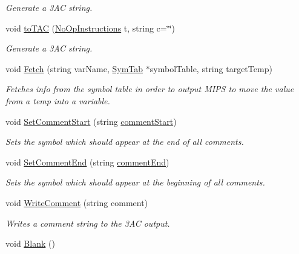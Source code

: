 \begin{DoxyCompactItemize}
\begin{DoxyCompactList}\small\item\em Generate a 3\-A\-C string. \end{DoxyCompactList}\item 
void \hyperlink{classTAC__Generator_a0ee1e11b169a2ead7244c00869d66858}{to\-T\-A\-C} (\hyperlink{classTAC__Generator_a3942f3e280fb83e44ad85eb13d56dfb5}{No\-Op\-Instructions} t, string c=\char`\"{}\char`\"{})
\begin{DoxyCompactList}\small\item\em Generate a 3\-A\-C string. \end{DoxyCompactList}\item 
void \hyperlink{classTAC__Generator_aacf5782b612a76a148478154306d3216}{Fetch} (string var\-Name, \hyperlink{classSymTab}{Sym\-Tab} $\ast$symbol\-Table, string target\-Temp)
\begin{DoxyCompactList}\small\item\em Fetches info from the symbol table in order to output M\-I\-P\-S to move the value from a temp into a variable. \end{DoxyCompactList}\item 
void \hyperlink{classTAC__Generator_a8570a01bd5bf10e849017d412440799a}{Set\-Comment\-Start} (string \hyperlink{classTAC__Generator_ac530666b410f226e764e9eb33b2a4666}{comment\-Start})
\begin{DoxyCompactList}\small\item\em Sets the symbol which should appear at the end of all comments. \end{DoxyCompactList}\item 
void \hyperlink{classTAC__Generator_ad96d5a262c29a34a34324ed6c7aeffe1}{Set\-Comment\-End} (string \hyperlink{classTAC__Generator_a9f011cfb810ea2cd01b31b9a48762123}{comment\-End})
\begin{DoxyCompactList}\small\item\em Sets the symbol which should appear at the beginning of all comments. \end{DoxyCompactList}\item 
void \hyperlink{classTAC__Generator_a37a03e11321195b25600eb008b20b800}{Write\-Comment} (string comment)
\begin{DoxyCompactList}\small\item\em Writes a comment string to the 3\-A\-C output. \end{DoxyCompactList}\item 
\hypertarget{classTAC__Generator_a3351d9d0d43b7b33591ed556c0261b84}{void \hyperlink{classTAC__Generator_a3351d9d0d43b7b33591ed556c0261b84}{Blank} ()}\label{classTAC__Generator_a3351d9d0d43b7b33591ed556c0261b84}


\end{DoxyCompactItemize}
